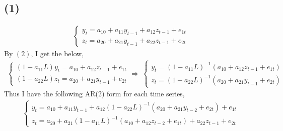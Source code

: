 \documentclass{article}
\begin{document}
\subsection{(1)}
\begin{align}
	\begin{cases}
	y_t = a_{10} + a_{11}y_{t-1} + a_{12}z_{t-1} + e_{1t}\\
	z_t = a_{20} + a_{21}y_{t-1} + a_{22}z_{t-1} + e_{2t}
	\end{cases}
\end{align}
By $(2)$, I get the below,
\begin{align}
	\begin{cases}
	(1-a_{11}L)y_t = a_{10} + a_{12}z_{t-1} + e_{1t}\\
	(1-a_{22}L)z_t = a_{20} + a_{21}y_{t-1} + e_{2t}
	\end{cases}
	\Rightarrow\ 
	\begin{cases}
	y_t = (1-a_{11}L)^{-1} \left( a_{10} + a_{12}z_{t-1} + e_{1t} \right)\\
	z_t = (1-a_{22}L)^{-1} \left( a_{20} + a_{21}y_{t-1} + e_{2t} \right)
	\end{cases}
\end{align}
Thus I have the following AR(2) form for each time series,
\begin{align}
	\begin{cases}
	y_t = a_{10} + a_{11}y_{t-1} + a_{12} (1-a_{22}L)^{-1} \left( a_{20} + a_{21}y_{t-2} + e_{2t} \right) + e_{1t}\\
	z_t = a_{20} + a_{21} (1-a_{11}L)^{-1} \left( a_{10} + a_{12}z_{t-2} + e_{1t} \right) + a_{22}z_{t-1} + e_{2t}
	\end{cases}
\end{align}
\end{document}
